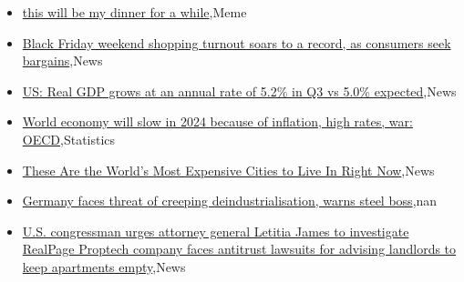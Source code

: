 \documentclass{article}%
\begin{document}
%
\begin{itemize}%
\item%
\href{https://reddit.com/r/wallstreetbets/comments/187fc43/this\_will\_be\_my\_dinner\_for\_a\_while/}{this will be my dinner for a while},Meme%
\item%
\href{https://reddit.com/r/StockMarket/comments/186v7h3/black\_friday\_weekend\_shopping\_turnout\_soars\_to\_a/}{Black Friday weekend shopping turnout soars to a record, as consumers seek bargains},News%
\item%
\href{https://reddit.com/r/StockMarket/comments/186pndi/us\_real\_gdp\_grows\_at\_an\_annual\_rate\_of\_52\_in\_q3/}{US: Real GDP grows at an annual rate of 5.2\% in Q3 vs 5.0\% expected},News%
\item%
\href{https://reddit.com/r/Economics/comments/18784zs/world\_economy\_will\_slow\_in\_2024\_because\_of/}{World economy will slow in 2024 because of inflation, high rates, war: OECD},Statistics%
\item%
\href{https://reddit.com/r/Economics/comments/18753fs/these\_are\_the\_worlds\_most\_expensive\_cities\_to/}{These Are the World's Most Expensive Cities to Live In Right Now},News%
\item%
\href{https://reddit.com/r/Economics/comments/1870ohx/germany\_faces\_threat\_of\_creeping/}{Germany faces threat of creeping deindustrialisation, warns steel boss},nan%
\item%
\href{https://reddit.com/r/Economics/comments/186xk3q/us\_congressman\_urges\_attorney\_general\_letitia/}{U.S. congressman urges attorney general Letitia James to investigate RealPage  Proptech company faces antitrust lawsuits for advising landlords to keep apartments empty},News%
\end{itemize}%
\end{document}
